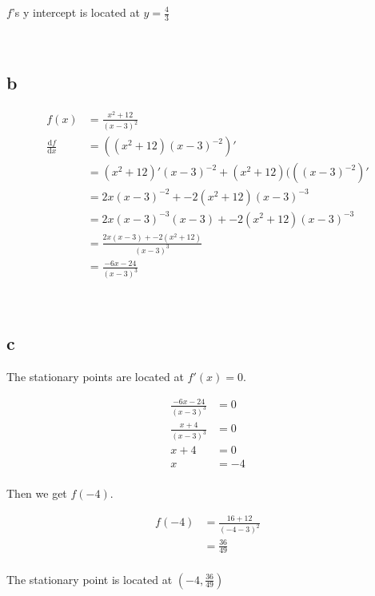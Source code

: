 \documentclass{article}
\newcommand{\Md}{\mathrm d}
\newcommand{\blankpage}{
    \newpage
    \
    \newpage
}
\begin{document}
$f$'s y intercept is located at $y = \frac 43$

\blankpage
\subsection{b}

\begin{align*}
    f(x) &= \frac{x^2 + 12}{(x-3)^2} \\
    \frac{\Md f}{\Md x} &= ((x^2 + 12)(x-3)^{-2})' \\
                        &= (x^2 + 12)'(x-3)^{-2} + (x^2 + 12){(((x-3)^{-2})}' \\
                        &= 2x(x-3)^{-2} + -2(x^2 + 12)(x-3)^{-3} \\
                        &= 2x(x-3)^{-3}(x-3) + -2(x^2 + 12)(x-3)^{-3} \\
                        &= \frac{2x(x-3) + -2(x^2 + 12)}{(x-3)^3} \\
                        &= \frac{-6x -24}{(x-3)^3}
\end{align*}

\blankpage
\subsection{c}

The stationary points are located at $f'(x)=0$.

\begin{align*}
    \frac{-6x -24}{(x-3)^3} &=  0 \\
    \frac{x + 4}{(x-3)^3}   &=  0 \\
    x + 4                   &=  0 \\
    x                       &= -4 \\
\end{align*}

Then we get $f(-4)$.

\begin{align*}
    f(-4) &= \frac{16 + 12}{(-4-3)^2} \\
          &= \frac{36}{49} \\
\end{align*}

The stationary point is located at $(-4, \frac{36}{49})$
\end{document}
